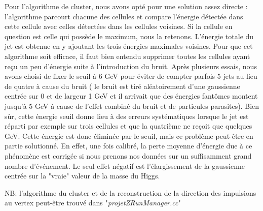 \documentclass[11pt]{article}
\begin{document}
Pour l'algorithme de cluster, nous avons opté pour une solution assez directe :
l'algorithme parcourt chacune des cellules et compare l'énergie
détectée dans cette cellule avec celles détectées dans les cellules voisines.
Si la cellule en question est celle qui possède le maximum, nous la retenons.
L'énergie totale du jet est obtenue en y ajoutant les trois énergies
maximales voisines. Pour que cet algorithme soit efficace, il faut bien entendu
supprimer toutes les cellules ayant reçu un peu d'énergie suite à
l'introduction du bruit. Après
plusieurs essais, nous avons choisi de fixer le seuil à 6 GeV pour éviter de
compter parfois 5 jets au lieu de quatre à cause du bruit ( le bruit est tiré
aléatoirement d'une gaussienne centrée sur 0 et de largeur 1 GeV et il arrivait
que des énergies fantômes montent jusqu'à 5 GeV à cause de l'effet combiné du
bruit et de particules parasites). Bien sûr, cette énergie seuil
donne lieu à des erreurs systématiques lorsque le jet est réparti par exemple
sur trois cellules et que la quatrième ne reçoit que quelques GeV. Cette
énergie est donc éliminée par le seuil, mais ce problème peut-être en partie
solutionné. En effet, une fois calibré, la perte moyenne d'énergie due à ce
phénomène est corrigée si nous prenons nos données sur un suffisamment grand
nombre d'événement. Le seul effet négatif est l'élargissement de la gaussienne
centrée sur la "vraie" valeur de la masse du Higgs.

NB: l'algorithme du cluster et de la reconstruction de la direction des
impulsions au vertex peut-être trouvé dans "\textit{projetZRunManager.cc}"
\end{document}
